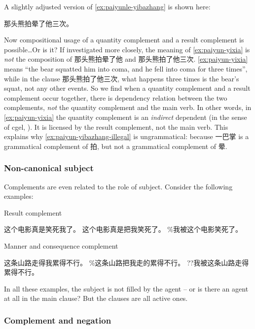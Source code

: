 \documentclass[../main.tex]{subfiles}
\begin{document}
A slightly adjusted version of \eqref{ex:paiyunle-yibazhang} is shown here:
\begin{exe}
    \ex 那头熊拍晕了他三次。
    \label{ex:paiyun-yixia}
\end{exe}
Now compositional usage of a quantity complement and a result complement is possible\dots Or is it?
If investigated more closely, the meaning of \eqref{ex:paiyun-yixia} is \emph{not} the composition 
of 那头熊拍晕了他 and 那头熊拍了他三次. \eqref{ex:paiyun-yixia} means ``the bear squatted him into
coma, and he fell into coma for three times'', while in the clause 那头熊拍了他三次, what happens 
three times is the bear's squat, not any other events. So we find when a quantity complement 
and a result complement occur together, there is dependency relation between the two complements, 
\emph{not} the quantity complement and the main verb. In other words, in \eqref{ex:paiyun-yixia}
the quantity complement is an \emph{indirect} dependent (in the sense of \ac{cgel}, ). 
It is licensed by the result complement, not the main verb. This explains why \eqref{ex:paiyun-yibazhang-illegal}
is ungrammatical: because 一巴掌 is a grammatical complement of 拍, but not a grammatical complement of 晕.

\subsubsection{Non-canonical subject}

Complements are even related to the role of subject. Consider the following examples:
\begin{exe}
    \ex Result complement
    \begin{xlist}
        \ex 这个电影真是笑死我了。
        \ex 这个电影真是把我笑死了。
        \ex \%我被这个电影笑死了。 %
    \end{xlist}
    \ex Manner and consequence complement 
    \begin{xlist}
        \ex 这条山路走得我累得不行。
        \ex \%这条山路把我走的累得不行。 %
        \ex ??我被这条山路走得累得不行。
    \end{xlist}
\end{exe}

In all these examples, the subject is not filled by the agent -- or is there an agent at all in the main clause?
But the clauses are all active ones. 

\subsubsection{Complement and negation}
\end{document}
